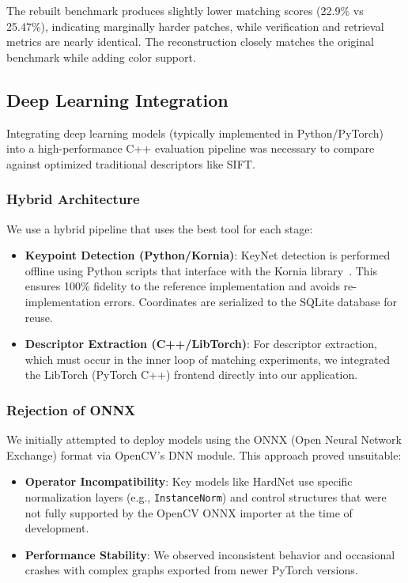 The rebuilt benchmark produces slightly lower matching scores (22.9\% vs 25.47\%), indicating marginally harder patches, while verification and retrieval metrics are nearly identical. The reconstruction closely matches the original benchmark while adding color support.

\subsection{Deep Learning Integration}

Integrating deep learning models (typically implemented in Python/PyTorch) into a high-performance C++ evaluation pipeline was necessary to compare against optimized traditional descriptors like SIFT.

\subsubsection{Hybrid Architecture}

We use a hybrid pipeline that uses the best tool for each stage:

\begin{itemize}
    \item \textbf{Keypoint Detection (Python/Kornia)}: KeyNet detection is performed offline using Python scripts that interface with the Kornia library~\cite{riba2020survey}. This ensures 100\% fidelity to the reference implementation and avoids re-implementation errors. Coordinates are serialized to the SQLite database for reuse.
    \item \textbf{Descriptor Extraction (C++/LibTorch)}: For descriptor extraction, which must occur in the inner loop of matching experiments, we integrated the LibTorch (PyTorch C++) frontend directly into our application.
\end{itemize}

\subsubsection{Rejection of ONNX}

We initially attempted to deploy models using the ONNX (Open Neural Network Exchange) format via OpenCV's DNN module. This approach proved unsuitable:
\begin{itemize}
    \item \textbf{Operator Incompatibility}: Key models like HardNet use specific normalization layers (e.g., \texttt{InstanceNorm}) and control structures that were not fully supported by the OpenCV ONNX importer at the time of development.
    \item \textbf{Performance Stability}: We observed inconsistent behavior and occasional crashes with complex graphs exported from newer PyTorch versions.
\end{itemize}

